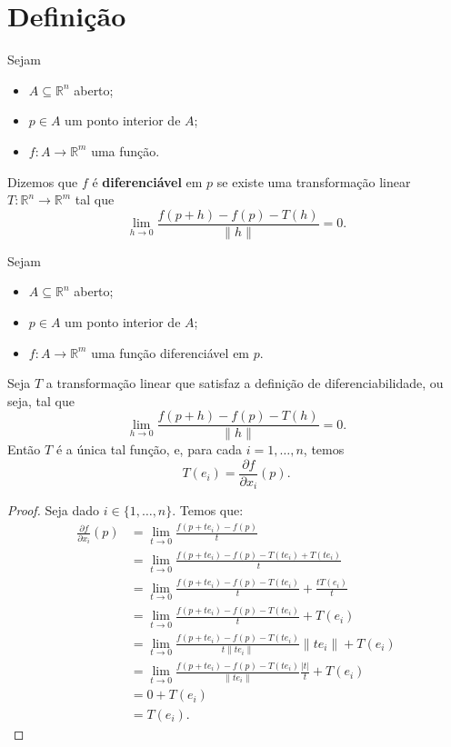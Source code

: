 \section{Definição}
\begin{definition}
    Sejam
    \begin{itemize}
        \item $A\subseteq \mathbb R^n$ aberto;
        \item $p \in A$ um ponto interior de $A$;
        \item $f:A\to \mathbb R^m$ uma função.
    \end{itemize}
    Dizemos que $f$ é \textbf{diferenciável} em $p$ se existe uma transformação linear $T:\mathbb R^n\to \mathbb R^m$ tal que
    \[
        \lim_{h\to 0} \frac{f(p+h)-f(p)-T(h)}{\|h\|} = 0.
    \]
\end{definition}

\begin{lemma}
    Sejam
    \begin{itemize}
        \item $A\subseteq \mathbb R^n$ aberto;
        \item $p \in A$ um ponto interior de $A$;
        \item $f:A\to \mathbb R^m$ uma função diferenciável em $p$.
    \end{itemize}
    Seja $T$ a transformação linear que satisfaz a definição de diferenciabilidade, ou seja, tal que
    \[
        \lim_{h\to 0} \frac{f(p+h)-f(p)-T(h)}{\|h\|} = 0.
    \]
    Então $T$ é a única tal função, e, para cada $i=1,\dots,n$, temos
    \[
        T(e_i) = \frac{\partial f}{\partial x_i}(p).
    \]
\end{lemma}

\begin{proof}
    Seja dado $i \in \{1,\dots,n\}$.
    Temos que:
    \begin{align*}
        \frac{\partial f}{\partial x_i}(p) &= \lim_{t\to 0} \frac{f(p+te_i)-f(p)}{t} \\
        &= \lim_{t\to 0} \frac{f(p+te_i)-f(p)-T(te_i)+T(te_i)}{t}\\
        &= \lim_{t\to 0} \frac{f(p+te_i)-f(p)-T(te_i)}{t} +\frac{tT(e_i)}{t} \\
        &= \lim_{t\to 0} \frac{f(p+te_i)-f(p)-T(te_i)}{t} + T(e_i) \\
        &= \lim_{t\to 0} \frac{f(p+te_i)-f(p)-T(te_i)}{t\|te_i\|}\|te_i\| + T(e_i) \\
        &= \lim_{t\to 0} \frac{f(p+te_i)-f(p)-T(te_i)}{\|te_i\|}\frac{|t|}{t} + T(e_i) \\
        &= 0 + T(e_i) \\
        &= T(e_i).
    \end{align*}
\end{proof}